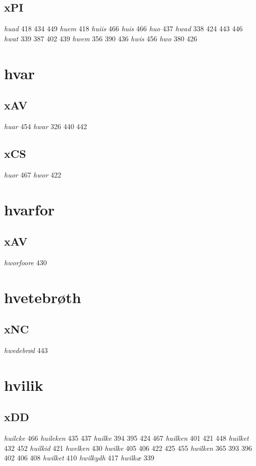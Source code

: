 \documentclass[a4paper,twocolumn]{article}
\begin{document}
\subsection{xPI}
\label{sec:org90bb122}
\emph{huad} 418 434 449 \emph{huem} 418 \emph{huiis} 466 \emph{huis} 466 \emph{huo} 437 \emph{hwad} 338 424 443 446 \emph{hwat} 339 387 402 439 \emph{hwem} 356 390 436 \emph{hwis} 456 \emph{hwo} 380 426 
\section{hvar}
\label{sec:org70d5ef9}
\subsection{xAV}
\label{sec:org61766d3}
\emph{huar} 454 \emph{hwar} 326 440 442 
\subsection{xCS}
\label{sec:orga5d003e}
\emph{huor} 467 \emph{hwor} 422 
\section{hvarfor}
\label{sec:org4ced6f0}
\subsection{xAV}
\label{sec:org3d59f5c}
\emph{hworfoore} 430 
\section{hvetebrøth}
\label{sec:orgecd1e31}
\subsection{xNC}
\label{sec:org04552a0}
\emph{hwedebrød} 443 
\section{hvilik}
\label{sec:org61f06d7}
\subsection{xDD}
\label{sec:orgdc585da}
\emph{huilcke} 466 \emph{huileken} 435 437 \emph{huilke} 394 395 424 467 \emph{huilken} 401 421 448 \emph{huilket} 432 452 \emph{huilkid} 421 \emph{hwelken} 430 \emph{hwilke} 405 406 422 425 455 \emph{hwilken} 365 393 396 402 406 408 \emph{hwilket} 410 \emph{hwilkydh} 417 \emph{hwilkæ} 339 
\end{document}
